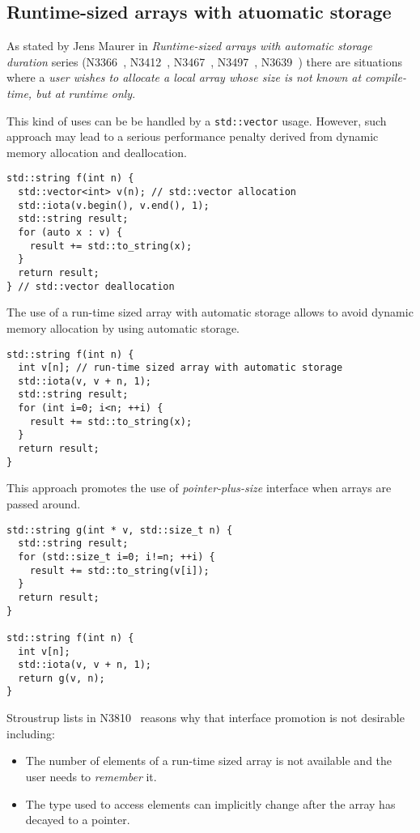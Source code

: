 \subsection{Runtime-sized arrays with atuomatic storage}

As stated by Jens Maurer in \emph{Runtime-sized arrays with automatic storage
duration} series (N3366~\cite{n3366}, N3412~\cite{n3412}, N3467~\cite{n3467},
N3497~\cite{n3497}, N3639~\cite{n3639}) there are situations where a \emph{user wishes to
allocate a local array whose size is not known at compile-time, but at runtime
only}.

This kind of uses can be be handled by a \verb+std::vector+ usage. However, such
approach may lead to a serious performance penalty derived from dynamic memory
allocation and deallocation.

\begin{lstlisting}
std::string f(int n) {
  std::vector<int> v(n); // std::vector allocation
  std::iota(v.begin(), v.end(), 1);
  std::string result;
  for (auto x : v) {
    result += std::to_string(x);
  }
  return result;
} // std::vector deallocation
\end{lstlisting}

The use of a run-time sized array with automatic storage allows to avoid dynamic
memory allocation by using automatic storage.

\begin{lstlisting}
std::string f(int n) {
  int v[n]; // run-time sized array with automatic storage
  std::iota(v, v + n, 1);
  std::string result;
  for (int i=0; i<n; ++i) {
    result += std::to_string(x);
  }
  return result;
} 
\end{lstlisting}

This approach promotes the use of \emph{pointer-plus-size} interface when arrays
are passed around.

\begin{lstlisting}
std::string g(int * v, std::size_t n) {
  std::string result;
  for (std::size_t i=0; i!=n; ++i) {
    result += std::to_string(v[i]);
  }
  return result;
}

std::string f(int n) {
  int v[n];
  std::iota(v, v + n, 1);
  return g(v, n);
} 
\end{lstlisting}

Stroustrup lists in N3810~\cite{n3810} reasons why that interface promotion is not desirable
including:

\begin{itemize}

\item The number of elements of a run-time sized array is not available and the
user needs to \emph{remember} it.

\item The type used to access elements can implicitly change after the array has
decayed to a pointer.

\end{itemize}
